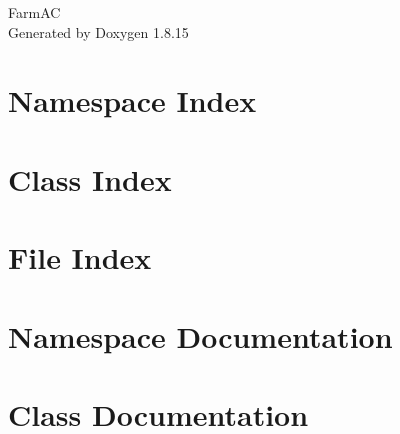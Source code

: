 \let\mypdfximage\pdfximage\def\pdfximage{\immediate\mypdfximage}\documentclass[twoside]{book}
\newcommand{\+}{\discretionary{\mbox{\scriptsize$\hookleftarrow$}}{}{}}
\newcommand{\clearemptydoublepage}{%
  \newpage{\pagestyle{empty}\cleardoublepage}%
}
\begin{document}
\hypersetup{pageanchor=false,
             bookmarksnumbered=true,
             pdfencoding=unicode
            }
\begin{titlepage}
\vspace*{7cm}
\begin{center}%
{\Large Farm\+AC }\\
\vspace*{1cm}
{\large Generated by Doxygen 1.8.15}\\
\end{center}
\end{titlepage}
\clearemptydoublepage
{}
\tableofcontents
\clearemptydoublepage
{}
\hypersetup{pageanchor=true}

\chapter{Namespace Index}

\chapter{Class Index}

\chapter{File Index}

\chapter{Namespace Documentation}


\chapter{Class Documentation}





































\end{document}
